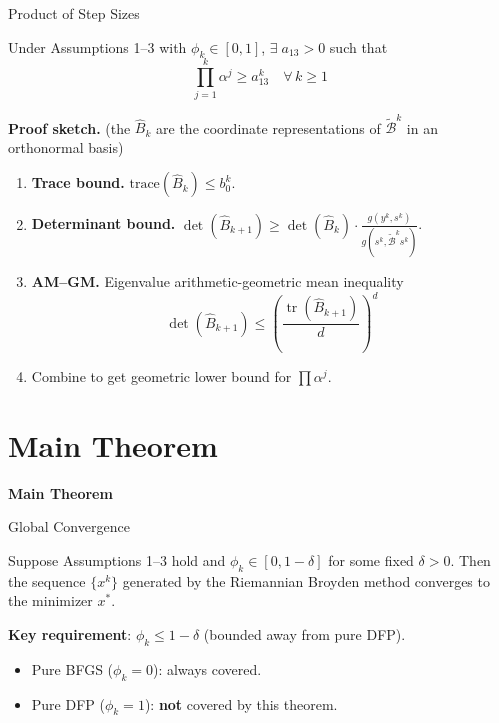 \documentclass[10pt,aspectratio=169]{beamer}
\DeclareMathOperator{\tr}{tr}
\begin{document}
\begin{frame}{Product of Step Sizes}
\begin{lemma}
Under Assumptions 1--3 with $\phi_k\in[0,1]$, $\exists\; a_{13}>0$ such that
$$\prod_{j=1}^k \alpha^j \geq a_{13}^k \quad \forall\, k\geq 1$$
\end{lemma}

\textbf{Proof sketch.} (the $\hat{B}_k$ are the coordinate representations of $\tilde{\mathcal{B}}^k$ in an orthonormal basis)
\begin{enumerate}
    \item \textbf{Trace bound.} $\mathrm{trace}(\hat{B}_k)\leq b_0^k$.
    \item \textbf{Determinant bound.} $\det(\hat{B}_{k+1})\geq \det(\hat{B}_k)\cdot\frac{g(y^k,s^k)}{g(s^k,\tilde{\mathcal{B}}^ks^k)}$.
    \item \textbf{AM--GM.} Eigenvalue arithmetic-geometric mean inequality
    $$\det(\hat{B}_{k+1})\leq \left(\frac{\tr(\hat{B}_{k+1})}{d}\right)^d$$
    \item Combine to get geometric lower bound for $\prod\alpha^j$.
\end{enumerate}
\end{frame}

\section{Main Theorem}

\begin{frame}{}
\centering
\vfill
{\Huge\bfseries Main Theorem}
\vfill
\end{frame}

\begin{frame}{Global Convergence}
\begin{theorem}
Suppose Assumptions 1--3 hold and $\phi_k\in[0,1-\delta]$ for some fixed $\delta>0$. Then the sequence $\{x^k\}$ generated by the Riemannian Broyden method converges to the minimizer $x^*$.
\end{theorem}
\bigskip
\textbf{Key requirement}: $\phi_k\leq 1-\delta$ (bounded away from pure DFP).
\begin{itemize}
    \item Pure BFGS ($\phi_k=0$): always covered.
    \item Pure DFP ($\phi_k=1$): \textbf{not} covered by this theorem.
\end{itemize}
\end{frame}
\end{document}
